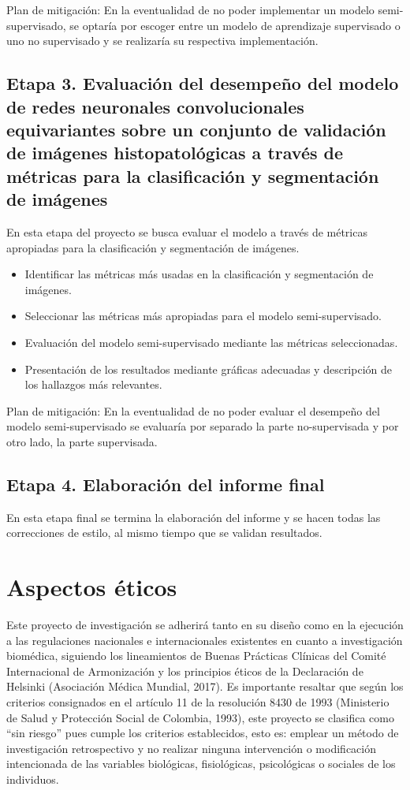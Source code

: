 \documentclass[12pt,letterpaper,final, openany]{scrbook}
\begin{document}
Plan de mitigación: En la eventualidad de no poder implementar un modelo semi-supervisado, se optaría por escoger entre un modelo de aprendizaje supervisado o uno no supervisado y se realizaría su respectiva implementación.


\section{Etapa 3. Evaluación del desempeño del modelo de redes neuronales convolucionales equivariantes sobre un conjunto de validación de imágenes histopatológicas a través de métricas para la clasificación y segmentación de imágenes}

En esta etapa del proyecto se busca evaluar el modelo a través de métricas apropiadas para la clasificación y segmentación de imágenes.

\begin{itemize}
    \item Identificar las métricas más usadas en la clasificación y segmentación de imágenes.
    \item Seleccionar las métricas más apropiadas para el modelo semi-supervisado.
    \item Evaluación del modelo semi-supervisado mediante las métricas seleccionadas. 
    \item Presentación de los resultados mediante gráficas adecuadas y descripción de los hallazgos más relevantes.
\end{itemize}

Plan de mitigación: En la eventualidad de no poder evaluar el desempeño del modelo semi-supervisado se evaluaría por separado la parte no-supervisada y por otro lado, la parte supervisada.

\section{Etapa 4. Elaboración del informe final}
En esta etapa final se termina la elaboración del informe y se hacen todas las correcciones de estilo, al mismo tiempo que se validan resultados.

\newpage
\chapter{Aspectos éticos}
Este proyecto de investigación se adherirá tanto en su diseño como en la ejecución a las regulaciones nacionales e internacionales existentes en cuanto a investigación biomédica, siguiendo los lineamientos de Buenas Prácticas Clínicas del Comité Internacional de Armonización y los principios éticos de la Declaración de Helsinki (Asociación Médica Mundial, 2017).
Es importante resaltar que según los criterios consignados en el artículo 11 de la resolución 8430 de 1993 (Ministerio de Salud y Protección Social de Colombia, 1993), este proyecto se clasifica como ``sin riesgo” pues cumple los criterios establecidos, esto es: emplear un método de investigación retrospectivo y no realizar ninguna intervención o modificación intencionada de las variables biológicas, fisiológicas, psicológicas o sociales de los individuos.
\end{document}
